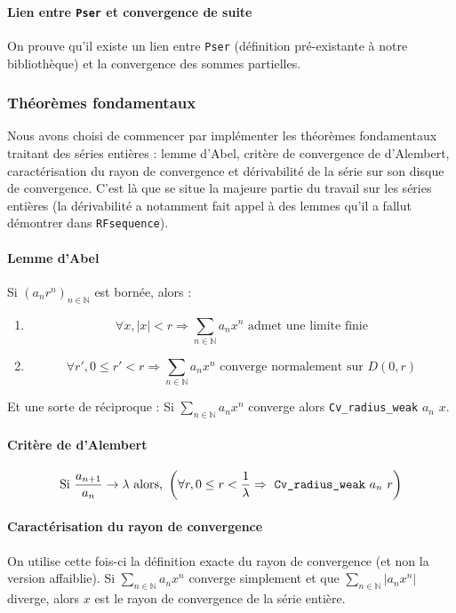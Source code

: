 \documentclass[a4paper,10pt]{article}
\newcommand{\coqcode}[1]{\texttt{#1}}
\begin{document}
\paragraph{Lien entre \coqcode{Pser} et convergence de suite} On prouve qu'il existe un lien entre \coqcode{Pser} (définition pré-existante à notre bibliothèque) et la convergence des sommes partielles.

\subsubsection{Théorèmes fondamentaux}

Nous avons choisi de commencer par implémenter les théorèmes fondamentaux traitant des séries entières : lemme d'Abel, critère de convergence de d'Alembert, caractérisation du rayon de convergence et dérivabilité de la série sur son disque de convergence. C'est là que se situe la majeure partie du travail sur les séries entières (la dérivabilité a notamment fait appel à des lemmes qu'il a fallut démontrer dans \coqcode{RFsequence}).

\paragraph{Lemme d'Abel} Si $\left(a_n r^n\right)_{n\in \mathbb{N}}$ est bornée, alors :
\begin{enumerate}
 \item $$\forall x, |x| < r \Rightarrow \sum_{n\in \mathbb{N}} a_n x^n \text{ admet une limite finie}$$
 \item $$\forall r', 0 \le r' < r \Rightarrow \sum_{n\in \mathbb{N}} a_n x^n \text{ converge normalement sur } D\left(0,r\right)$$
\end{enumerate}

Et une sorte de réciproque : Si $\sum_{n\in \mathbb{N}} a_n x^n$ converge alors \coqcode{Cv\_radius\_weak} $a_n$ $x$.

\paragraph{Critère de d'Alembert} $$\text{Si } \frac{a_{n + 1}}{a_n} \rightarrow \lambda \text{ alors, } \left( \forall r, 0 \le r < \frac{1}{\lambda} \Rightarrow \text{ \coqcode{Cv\_radius\_weak} } a_n~ r\right)$$

\paragraph{Caractérisation du rayon de convergence} On utilise cette fois-ci la définition exacte du rayon de convergence (et non la version affaiblie). Si $\sum_{n\in \mathbb{N}} a_n x^n$ converge simplement et que $\sum_{n\in \mathbb{N}} |a_n x^n|$ diverge, alors $x$ est le rayon de convergence de la série entière.
\end{document}
